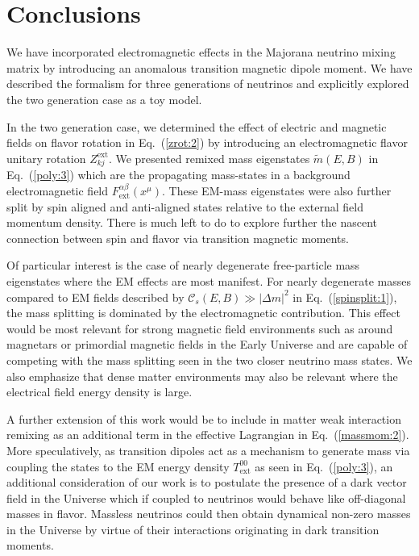 \documentclass[addchapnum]{ws-rv961x669} %
\newcommand{\req}[1]{Eq.~(\ref{#1})}
\begin{document}
\section{Conclusions}
We have incorporated electromagnetic effects in the Majorana neutrino mixing matrix by introducing an anomalous transition magnetic dipole moment. We have described the formalism for three generations of neutrinos and explicitly explored the two generation case as a toy model. 

In the two generation case, we determined the effect of electric and magnetic fields on flavor rotation in \req{zrot:2} by introducing an electromagnetic flavor unitary rotation $Z_{kj}^\mathrm{ext}$. We presented remixed mass eigenstates $\widetilde m(E,B)$ in \req{poly:3} which are the propagating mass-states in a background electromagnetic field $F^{\alpha\beta}_\mathrm{ext}(x^{\mu})$. These EM-mass eigenstates were also further split by spin aligned and anti-aligned states relative to the external field momentum density. There is much left to do to explore further the nascent connection between spin and flavor via transition magnetic moments. 

Of particular interest is the case of nearly degenerate free-particle mass eigenstates where the EM effects are most manifest. For nearly degenerate masses compared to EM fields described by $\mathcal{C}_{s}(E,B)\gg|\Delta m|^{2}$ in \req{spinsplit:1}, the mass splitting is dominated by the electromagnetic contribution. This effect would be most relevant for strong magnetic field environments such as around magnetars or primordial magnetic fields in the Early Universe and are capable of competing with the mass splitting seen in the two closer neutrino mass states. We also emphasize that dense matter environments may also be relevant where the electrical field energy density is large.

A further extension of this work would be to include in matter weak interaction remixing as an additional term in the effective Lagrangian in \req{massmom:2}. More speculatively, as transition dipoles act as a mechanism to generate mass via coupling the states to the EM energy density $T_\mathrm{ext}^{00}$ as seen in \req{poly:3}, an additional consideration of our work is to postulate the presence of a dark vector field in the Universe which if coupled to neutrinos would behave like off-diagonal masses in flavor. Massless neutrinos could then obtain dynamical non-zero masses in the Universe by virtue of their interactions originating in dark transition moments.
\end{document}

